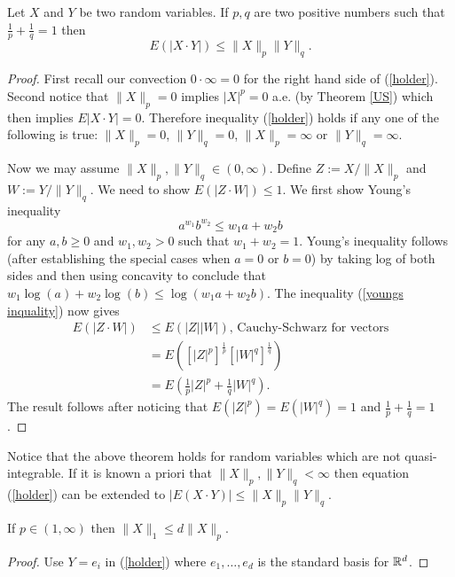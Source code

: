 \begin{theorem}[{\bf H\"older}]
Let $X$ and $Y$ be two random variables. If $p, q$ are two positive numbers such that $\frac{1}{p}+\frac{1}{q}=1$ then
\begin{equation}
\label{holder}
E(|X\cdot Y|)\leq \| X\|_p\|Y\|_q.
\end{equation}
\end{theorem}
\begin{proof}
First recall our convection $0 \cdot \infty = 0$ for the right hand side of (\ref{holder}). Second notice that $\| X\|_p=0$ implies $|X|^p=0$ a.e. (by Theorem \ref{US}) which then implies $E|X\cdot Y|=0$. Therefore inequality (\ref{holder}) holds if any one of the following is true: $ \| X\|_p = 0$, $\| Y\|_q = 0$, $\| X\|_p = \infty$ or $\| Y\|_q = \infty$.

Now we may assume $ \| X\|_p, \|Y \|_q \in (0,\infty)$. Define $Z:= X/\| X\|_p$ and $W := Y/\|Y\|_q$. We need to show $E(|Z\cdot W|)\leq 1$.
We first show Young's inequality
\begin{equation}
\label{youngs inquality}
a^{w_1}b^{w_2}\leq w_1 a + w_2 b
\end{equation}
for any $a,b\geq 0$ and $w_1, w_2 >0$ such that $w_1 + w_2 = 1$. Young's inequality follows (after establishing the special cases when $a=0$ or $b=0$) by taking log of both sides and then using concavity to conclude that $w_1 \log(a) + w_2\log(b)\leq \log(w_1a+w_2b)$. The inequality (\ref{youngs inquality}) now gives
\begin{align*}
E(|Z\cdot W|)&\leq E(|Z||W|),\,\text{Cauchy-Schwarz for vectors} \\
&=E([|Z|^p]^{\frac{1}{p}}[|W|^q]^{\frac{1}{q}}) \\
&=E(\frac{1}{p}|Z|^p +\frac{1}{q} |W|^q).
\end{align*}
The result follows after noticing that $E(|Z|^p) = E(|W|^q)=1$ and $\frac{1}{p}+\frac{1}{q}=1$.
\end{proof}

Notice that the above theorem holds for random variables which are not quasi-integrable. If it is known a priori that $\| X\|_p, \|Y\|_q<\infty$ then equation (\ref{holder}) can be extended to $| E(X\cdot Y) |\leq \| X\|_p\|Y\|_q$.


\begin{theorem} If $p\in(1,\infty)$ then  $\|X\|_1 \leq d\|X\|_p$.
\end{theorem}
\begin{proof} Use $Y = e_i$ in (\ref{holder}) where $e_1,\ldots, e_d$ is the standard basis for $\Bbb R^d$.
\end{proof}


